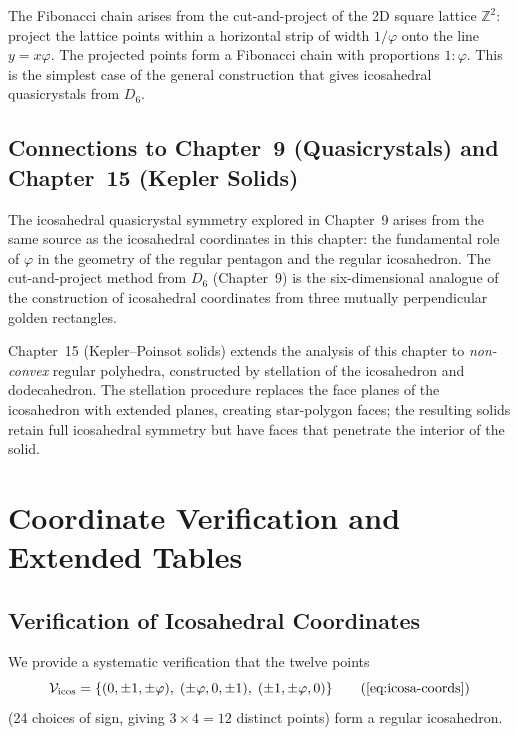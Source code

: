 The Fibonacci chain arises from the cut-and-project of the 2D square lattice
$\mathbb{Z}^2$: project the lattice points within a horizontal strip of width
$1/\varphi$ onto the line $y = x\varphi$.  The projected points form a
Fibonacci chain with proportions $1 : \varphi$.  This is the simplest case of
the general construction that gives icosahedral quasicrystals from $D_6$.

\subsection{Connections to Chapter~9 (Quasicrystals) and Chapter~15 (Kepler Solids)}
\label{sec:ch-links}

The icosahedral quasicrystal symmetry explored in Chapter~9 arises from the
same source as the icosahedral coordinates in this chapter: the fundamental role
of $\varphi$ in the geometry of the regular pentagon and the regular icosahedron.
The cut-and-project method from $D_6$ (Chapter~9) is the six-dimensional
analogue of the construction of icosahedral coordinates from three mutually
perpendicular golden rectangles.

Chapter~15 (Kepler–Poinsot solids) extends the analysis of this chapter to
\emph{non-convex} regular polyhedra, constructed by stellation of the icosahedron
and dodecahedron.  The stellation procedure replaces the face planes of the
icosahedron with extended planes, creating star-polygon faces; the resulting
solids retain full icosahedral symmetry but have faces that penetrate the interior
of the solid.


\section{Coordinate Verification and Extended Tables}
\label{sec:coordinate-verification}

\subsection{Verification of Icosahedral Coordinates}
\label{subsec:icosa-verify}

We provide a systematic verification that the twelve points
\begin{equation}
  \mathcal{V}_{\text{icos}} = \{(0,\pm 1,\pm\varphi),\;(\pm\varphi,0,\pm 1),\;(\pm 1,\pm\varphi,0)\}
  \tag{\ref{eq:icosa-coords}}
\end{equation}
(24 choices of sign, giving $3 \times 4 = 12$ distinct points) form a regular
icosahedron.

